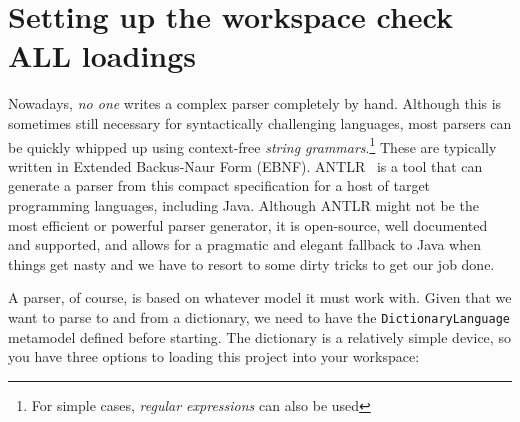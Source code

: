 \newpage
\section{Setting up the workspace \update check ALL loadings}
\genHeader

Nowadays, \emph{no one} writes a complex parser completely by hand. Although this is sometimes still necessary for syntactically challenging languages, most
parsers can be quickly whipped up using context-free \emph{string grammars}.\footnote{For simple cases, \emph{regular expressions} can also be used} These are
typically written in Extended Backus-Naur Form (EBNF). ANTLR~\cite{ANTLR} is a tool that can generate a parser from this compact specification for
a host of target programming languages, including Java. Although ANTLR might not be the most efficient or powerful parser generator, it is open-source, well
documented and supported, and allows for a pragmatic and elegant fallback to Java when things get nasty and we have to resort to some dirty tricks to get our
job done.

A parser, of course, is based on whatever model it must work with. Given that we want to parse to and from a dictionary, we need to have the
\texttt{DictionaryLanguage} metamodel defined before starting. The dictionary is a relatively simple device, so you have three options to loading this project
into your workspace:

